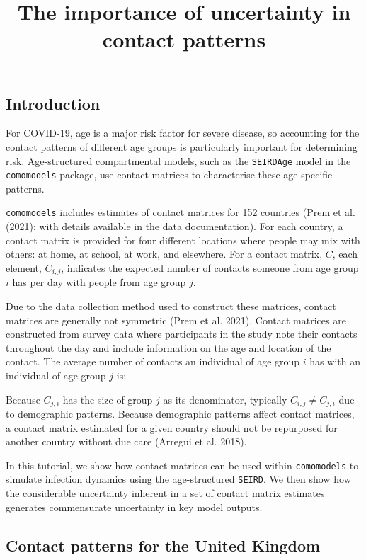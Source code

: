 \documentclass[
]{article}
\title{The importance of uncertainty in contact patterns}
\author{}
\date{\vspace{-2.5em}}
\begin{document}
\maketitle

\hypertarget{introduction}{%
\subsection{Introduction}\label{introduction}}

For COVID-19, age is a major risk factor for severe disease, so
accounting for the contact patterns of different age groups is
particularly important for determining risk. Age-structured
compartmental models, such as the \texttt{SEIRDAge} model in the
\texttt{comomodels} package, use contact matrices to characterise these
age-specific patterns.

\texttt{comomodels} includes estimates of contact matrices for 152
countries (Prem et al. (2021); with details available in the data
documentation). For each country, a contact matrix is provided for four
different locations where people may mix with others: at home, at
school, at work, and elsewhere. For a contact matrix, \(C\), each
element, \(C_{i,j}\), indicates the expected number of contacts someone
from age group \(i\) has per day with people from age group \(j\).

Due to the data collection method used to construct these matrices,
contact matrices are generally not symmetric (Prem et al. 2021). Contact
matrices are constructed from survey data where participants in the
study note their contacts throughout the day and include information on
the age and location of the contact. The average number of contacts an
individual of age group \(i\) has with an individual of age group \(j\)
is:

Because \(C_{j,i}\) has the size of group \(j\) as its denominator,
typically \(C_{i,j}\neq C_{j,i}\) due to demographic patterns. Because
demographic patterns affect contact matrices, a contact matrix estimated
for a given country should not be repurposed for another country without
due care (Arregui et al. 2018).

In this tutorial, we show how contact matrices can be used within
\texttt{comomodels} to simulate infection dynamics using the
age-structured \texttt{SEIRD}. We then show how the considerable
uncertainty inherent in a set of contact matrix estimates generates
commensurate uncertainty in key model outputs.

\hypertarget{contact-patterns-for-the-united-kingdom}{%
\subsection{Contact patterns for the United
Kingdom}\label{contact-patterns-for-the-united-kingdom}}
\end{document}
